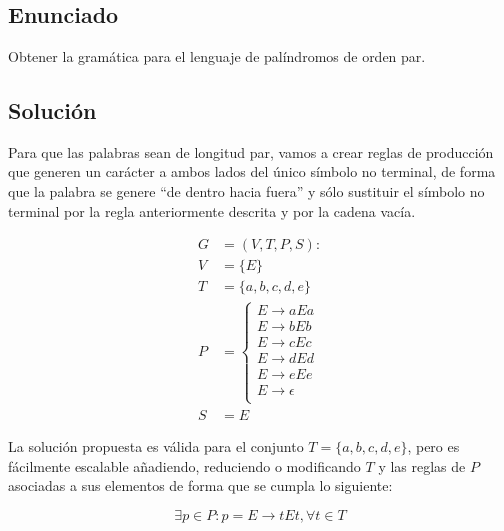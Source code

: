\chapter{}

\section{Enunciado}

Obtener la gramática para el lenguaje de palíndromos de orden par.

\section{Solución}

Para que las palabras sean de longitud par, vamos a crear reglas de producción que generen un carácter a ambos lados del único símbolo no terminal, de forma que la palabra se genere ``de dentro hacia fuera'' y sólo sustituir el símbolo no terminal por la regla anteriormente descrita y por la cadena vacía.

\begin{align*}
	G &= (V, T, P, S) : \\
	V &= \{E\} \\
	T &= \{a, b, c, d, e\} \\
	P &=
		\begin{cases}
			E \rightarrow aEa      \\
			E \rightarrow bEb      \\
			E \rightarrow cEc      \\
			E \rightarrow dEd      \\
			E \rightarrow eEe      \\
			E \rightarrow \epsilon \\
 		\end{cases} \\
	S &= E
\end{align*}

La solución propuesta es válida para el conjunto $T = \{a, b, c, d, e\}$, pero es fácilmente escalable añadiendo, reduciendo o modificando $T$ y las reglas de $P$ asociadas a sus elementos de forma que se cumpla lo siguiente:

\[\exists p \in P : p = E \rightarrow tEt, \forall t \in T\]
